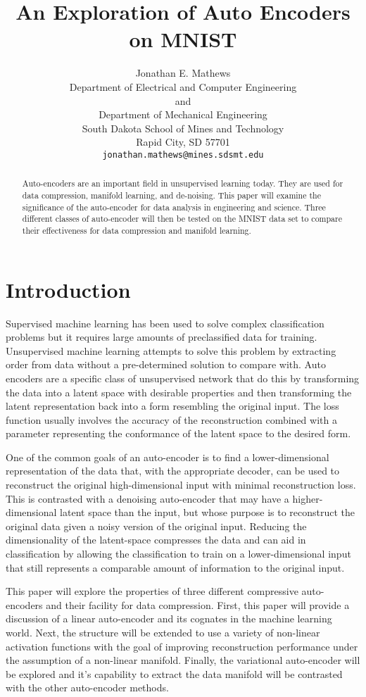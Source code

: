 \documentclass{article}
\title{An Exploration of Auto Encoders on MNIST}
\author{
  Jonathan E. Mathews\\
  Department of Electrical and Computer Engineering\\
  and\\
  Department of Mechanical Engineering\\
  South Dakota School of Mines and Technology\\
  Rapid City, SD 57701 \\
  \texttt{jonathan.mathews@mines.sdsmt.edu} \\
}
\begin{document}
\maketitle

\begin{abstract}
  Auto-encoders are an important field in unsupervised learning today. They are used for data compression, manifold learning, and de-noising. This paper will examine the significance of the auto-encoder for data analysis in engineering and science. Three different classes of auto-encoder will then be tested on the MNIST data set to compare their effectiveness for data compression and manifold learning.
\end{abstract}

\section{Introduction}
Supervised machine learning has been used to solve complex classification problems but it requires large amounts of preclassified data for training. Unsupervised machine learning attempts to solve this problem by extracting order from data without a pre-determined solution to compare with. Auto encoders are a specific class of unsupervised network that do this by transforming the data into a latent space with desirable properties and then transforming the latent representation back into a form resembling the original input. The loss function usually involves the accuracy of the reconstruction combined with a parameter representing the conformance of the latent space to the desired form.

One of the common goals of an auto-encoder is to find a lower-dimensional representation of the data that, with the appropriate decoder, can be used to reconstruct the original high-dimensional input with minimal reconstruction loss. This is contrasted with a denoising auto-encoder that may have a higher-dimensional latent space than the input, but whose purpose is to reconstruct the original data given a noisy version of the original input. Reducing the dimensionality of the latent-space compresses the data and can aid in classification by allowing the classification to train on a lower-dimensional input that still represents a comparable amount of information to the original input.

This paper will explore the properties of three different compressive auto-encoders and their facility for data compression.  First, this paper will provide a discussion of a linear auto-encoder and its cognates in the machine learning world. Next, the structure will be extended to use a variety of non-linear activation functions with the goal of improving reconstruction performance under the assumption of a non-linear manifold. Finally, the variational auto-encoder will be explored and it's capability to extract the data manifold will be contrasted with the other auto-encoder methods.
\end{document}
